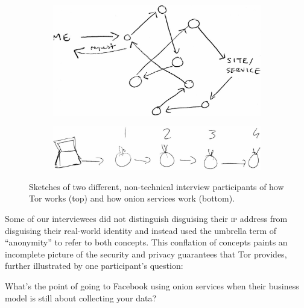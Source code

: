 \begin{figure}[t]
    \centering

    \begin{subfigure}[t]{\linewidth}
        \centering
        \includegraphics[width=0.8\linewidth]{figures/tor-sketch.jpg}
        \label{fig:tor-sketch}
    \end{subfigure}

    \begin{subfigure}[t]{\linewidth}
        \centering
        \includegraphics[width=0.8\linewidth]{figures/os-sketch.jpg}
        \label{fig:os-sketch}
    \end{subfigure}

    \caption{Sketches of two different, non-technical interview participants of
    how Tor works (top) and how onion services work (bottom).}
\end{figure}

Some of our interviewees did not distinguish disguising their \textsc{ip}
address from disguising their real-world identity and instead used the umbrella
term of ``anonymity'' to refer to both concepts.  This conflation of concepts
paints an incomplete picture of the security and privacy guarantees that Tor
provides, further illustrated by one participant's question:

\begin{displayquote}[P07]
What's the point of going to Facebook using onion services when their business
model is still about collecting your data?
\end{displayquote}

